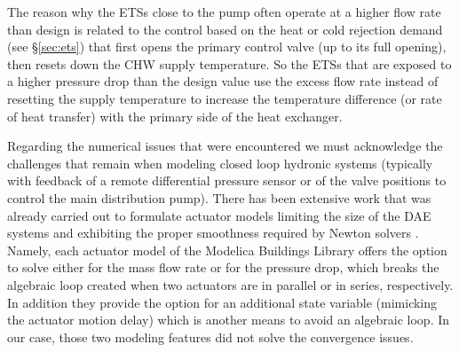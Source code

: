 The reason why the ETSs close to the pump often operate at a higher flow rate than design is related to the control based on the heat or cold rejection demand (see §\ref{sec:ets}) that first opens the primary control valve (up to its full opening), then resets down the CHW supply temperature. So the ETSs that are exposed to a higher pressure drop than the design value use the excess flow rate instead of resetting the supply temperature to increase the temperature difference (or rate of heat transfer) with the primary side of the heat exchanger.

Regarding the numerical issues that were encountered we must acknowledge the challenges that remain when modeling closed loop hydronic systems (typically with feedback of a remote differential pressure sensor or of the valve positions to control the main distribution pump).
There has been extensive work that was already carried out to formulate actuator models limiting the size of the DAE systems and exhibiting the proper smoothness required by Newton solvers \cite{Jorissen2015}.
Namely, each actuator model of the Modelica Buildings Library offers the option to solve either for the mass flow rate or for the pressure drop, which breaks the algebraic loop created when two actuators are in parallel or in series, respectively. In addition they provide the option for an additional state variable (mimicking the actuator motion delay) which is another means to avoid an algebraic loop.
In our case, those two modeling features did not solve the convergence issues.

